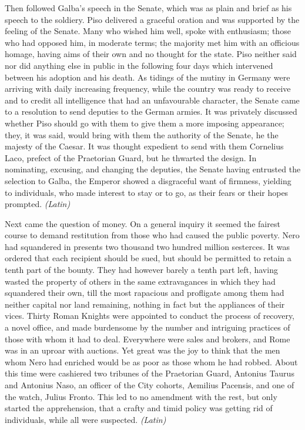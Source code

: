 Then followed Galba's speech in the Senate, which was as plain and brief as his speech to the soldiery. Piso delivered a graceful oration and was supported by the feeling of the Senate. Many who wished him well, spoke with enthusiasm; those who had opposed him, in moderate terms; the majority met him with an officious homage, having aims of their own and no thought for the state. Piso neither said nor did anything else in public in the following four days which intervened between his adoption and his death. As tidings of the mutiny in Germany were arriving with daily increasing frequency, while the country was ready to receive and to credit all intelligence that had an unfavourable character, the Senate came to a resolution to send deputies to the German armies. It was privately discussed whether Piso should go with them to give them a more imposing appearance; they, it was said, would bring with them the authority of the Senate, he the majesty of the Caesar. It was thought expedient to send with them Cornelius Laco, prefect of the Praetorian Guard, but he thwarted the design. In nominating, excusing, and changing the deputies, the Senate having entrusted the selection to Galba, the Emperor showed a disgraceful want of firmness, yielding to individuals, who made interest to stay or to go, as their fears or their hopes prompted. \emph{(Latin)}


Next came the question of money. On a general inquiry it seemed the fairest course to demand restitution from those who had caused the public poverty. Nero had squandered in presents two thousand two hundred million sesterces. It was ordered that each recipient should be sued, but should be permitted to retain a tenth part of the bounty. They had however barely a tenth part left, having wasted the property of others in the same extravagances in which they had squandered their own, till the most rapacious and profligate among them had neither capital nor land remaining, nothing in fact but the appliances of their vices. Thirty Roman Knights were appointed to conduct the process of recovery, a novel office, and made burdensome by the number and intriguing practices of those with whom it had to deal. Everywhere were sales and brokers, and Rome was in an uproar with auctions. Yet great was the joy to think that the men whom Nero had enriched would be as poor as those whom he had robbed. About this time were cashiered two tribunes of the Praetorian Guard, Antonius Taurus and Antonius Naso, an officer of the City cohorts, Aemilius Pacensis, and one of the watch, Julius Fronto. This led to no amendment with the rest, but only started the apprehension, that a crafty and timid policy was getting rid of individuals, while all were suspected. \emph{(Latin)}

